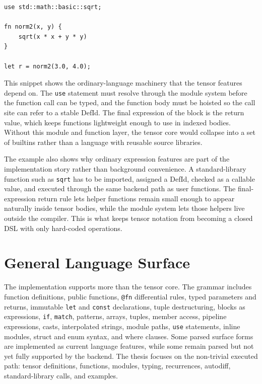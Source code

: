 \begin{lstlisting}[style=einlang]
use std::math::basic::sqrt;

fn norm2(x, y) {
    sqrt(x * x + y * y)
}

let r = norm2(3.0, 4.0);
\end{lstlisting}

This snippet shows the ordinary-language machinery that the tensor features
depend on. The \texttt{use} statement must resolve through the module system
before the function call can be typed, and the function body must be hoisted so
the call site can refer to a stable DefId. The final expression of the block is
the return value, which keeps functions lightweight enough to use in indexed
bodies. Without this module and function layer, the tensor core would collapse
into a set of builtins rather than a language with reusable source libraries.

The example also shows why ordinary expression features are part of the
implementation story rather than background convenience. A standard-library
function such as \texttt{sqrt} has to be imported, assigned a DefId, checked as
a callable value, and executed through the same backend path as user functions.
The final-expression return rule lets helper functions remain small enough to
appear naturally inside tensor bodies, while the module system lets those
helpers live outside the compiler. This is what keeps tensor notation from
becoming a closed DSL with only hard-coded operations.

\section{General Language Surface}

The implementation supports more than the tensor core. The grammar includes
function definitions, public functions, \texttt{@fn} differential rules, typed
parameters and returns, immutable \texttt{let} and \texttt{const} declarations,
tuple destructuring, blocks as expressions, \texttt{if}, \texttt{match},
patterns, arrays, tuples, member access, pipeline expressions, casts,
interpolated strings, module paths, \texttt{use} statements, inline modules,
struct and enum syntax, and where clauses. Some parsed surface forms are
implemented as current language features, while some remain parsed but not yet
fully supported by the backend. The thesis focuses on the non-trivial executed
path: tensor definitions, functions, modules, typing, recurrences, autodiff,
standard-library calls, and examples.

